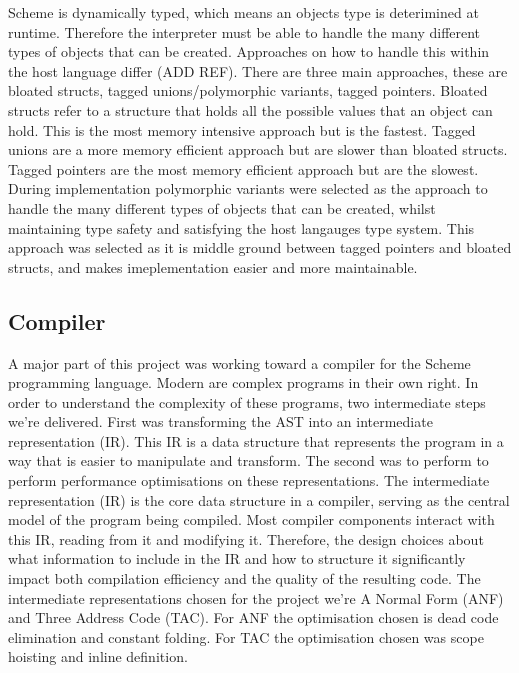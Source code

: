 \documentclass[final]{cmpreport_02}
\begin{document}
Scheme is dynamically typed, which means an objects type is deterimined at runtime. Therefore the interpreter must be able to handle the many different types of objects that can be created. 
Approaches on how to handle this within the host language differ (ADD REF). There are three main approaches, these are bloated structs, tagged unions/polymorphic variants, tagged pointers. 
Bloated structs refer to a structure that holds all the possible values that an object can hold. This is the most memory intensive approach but is the fastest. Tagged unions are a more memory efficient approach but are slower than bloated structs. Tagged pointers are the most memory efficient approach but are the slowest.
During implementation polymorphic variants were selected as the approach to handle the many different types of objects that can be created, whilst maintaining type safety and satisfying the host langauges type system. 
This approach was selected as it is middle ground between tagged pointers and bloated structs, and makes imeplementation easier and more maintainable.

\subsection{Compiler}
A major part of this project was working toward a compiler for the Scheme programming language. Modern are complex programs in their own right. In order to understand the complexity of these programs, two intermediate steps we're delivered.
First was transforming the AST into an intermediate representation (IR). This IR is a data structure that represents the program in a way that is easier to manipulate and transform. The second was to perform to perform performance optimisations on these representations.
The intermediate representation (IR) is the core data structure in a compiler, serving as the central model of the program being compiled. Most compiler components interact with this IR, reading from it and modifying it. Therefore, the design choices about what information to include in the IR and how to structure it significantly impact both compilation efficiency and the quality of the resulting code. \cite{cooper2011engineering}
The intermediate representations chosen for the project we're A Normal Form (ANF) and Three Address Code (TAC). For ANF the optimisation chosen is dead code elimination and constant folding. For TAC the optimisation chosen was scope hoisting and inline definition.
\end{document}
